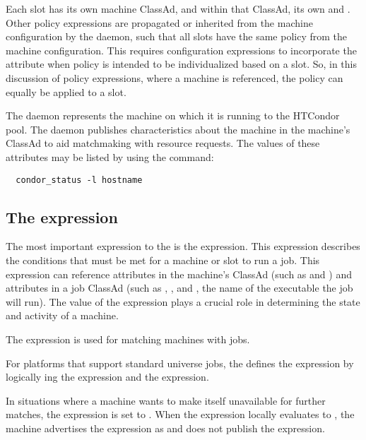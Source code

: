 Each slot has its own machine ClassAd, and within that ClassAd,
its own  and .
Other policy expressions are propagated or inherited from the 
machine configuration by the  daemon,
such that all slots have the same policy from the 
machine configuration.
This requires configuration expressions to incorporate the 
attribute when policy is intended to be individualized
based on a slot.
So, in this discussion of policy expressions,
where a machine is referenced,  
the policy can equally be applied to a slot.

The  daemon represents the machine on which it is running to
the HTCondor pool.  
The daemon publishes characteristics about the
machine in the machine's ClassAd to aid matchmaking with resource requests.
The values of these attributes may be listed by using the command:
\begin{verbatim}
  condor_status -l hostname
\end{verbatim}

\subsection{\label{sec:Start-Expr}
The  expression}

The most important expression to the 
is the  expression.  
This expression describes the conditions that must be met for a
machine or slot to run a job. 
This expression can reference attributes
in the machine's ClassAd (such as  and )
and attributes in a job ClassAd (such as
, , and , the name of the
executable the job will run).
The value of the  expression plays a crucial role in
determining the state and activity of a machine.

The  expression is used for
matching machines with jobs.

For platforms that support standard universe jobs,
the  defines the
 expression by logically ing the 
 expression and the 
expression. 

In situations where a machine wants to make itself
unavailable for further matches, the 
expression is set to .  
When the  expression locally evaluates to , the
machine advertises the  expression as  and
does not publish the  expression.

